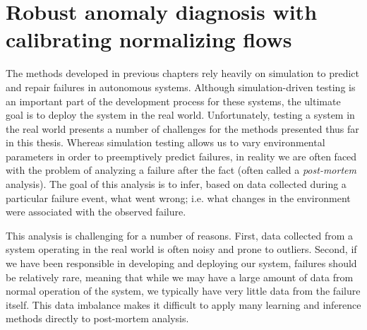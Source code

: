 \chapter{Robust anomaly diagnosis with calibrating normalizing flows}\label{ch:icml}

The methods developed in previous chapters rely heavily on simulation to predict and repair failures in autonomous systems. Although simulation-driven testing is an important part of the development process for these systems, the ultimate goal is to deploy the system in the real world. Unfortunately, testing a system in the real world presents a number of challenges for the methods presented thus far in this thesis. Whereas simulation testing allows us to vary environmental parameters in order to preemptively predict failures, in reality we are often faced with the problem of analyzing a failure after the fact (often called a \textit{post-mortem} analysis). The goal of this analysis is to infer, based on data collected during a particular failure event, what went wrong; i.e. what changes in the environment were associated with the observed failure.

This analysis is challenging for a number of reasons. First, data collected from a system operating in the real world is often noisy and prone to outliers. Second, if we have been responsible in developing and deploying our system, failures should be relatively rare, meaning that while we may have a large amount of data from normal operation of the system, we typically have very little data from the failure itself. This data imbalance makes it difficult to apply many learning and inference methods directly to post-mortem analysis.

